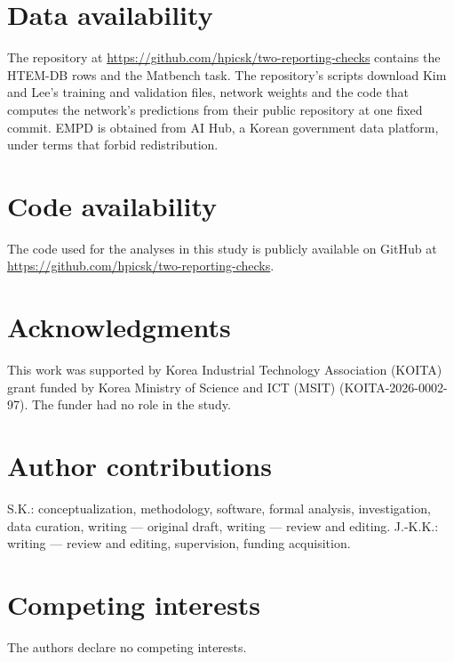 \documentclass[11pt]{article}
\begin{document}
\section*{Data availability}

The repository at \url{https://github.com/hpicsk/two-reporting-checks} contains the HTEM-DB
rows\cite{zakutayev2018htem} and the Matbench
task.\cite{zhuo2018bandgap,dunn2020matbench} The repository's scripts
download Kim and Lee's
training and validation files, network weights and the code that computes the
network's predictions from their public repository at one fixed
commit.\cite{kim2025descriptors} EMPD\cite{aihubMaterials} is obtained from AI
Hub, a Korean government data platform, under terms that forbid
redistribution.

\section*{Code availability}

The code used for the analyses in this study is publicly available on GitHub at
\url{https://github.com/hpicsk/two-reporting-checks}.




\section*{Acknowledgments}

This work was supported by Korea Industrial Technology Association (KOITA)
grant funded by Korea Ministry of Science and ICT (MSIT) (KOITA-2026-0002-97).
The funder had no role in the study.

\section*{Author contributions}

S.K.: conceptualization, methodology, software, formal analysis, investigation,
data curation, writing --- original draft, writing --- review and editing.
J.-K.K.: writing --- review and editing, supervision, funding acquisition.

\section*{Competing interests}

The authors declare no competing interests.

\clearpage
\end{document}
